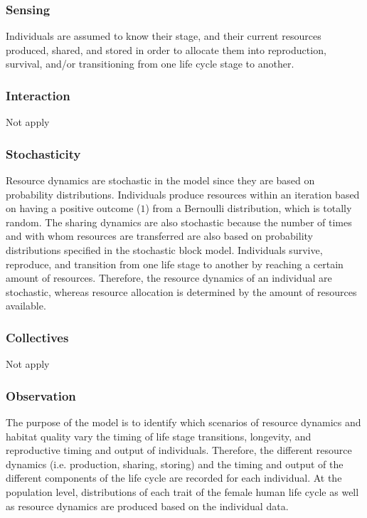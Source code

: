\documentclass{article}
\begin{document}
\subsubsection{Sensing}

Individuals are assumed to know their stage, and their current resources produced, shared, and stored in order to allocate them into reproduction, survival, and/or transitioning from one life cycle stage to another.

\subsubsection{Interaction}

Not apply

\subsubsection{Stochasticity}

Resource dynamics are stochastic in the model since they are based on probability distributions. Individuals produce resources within an iteration based on having a positive outcome ($1$) from a Bernoulli distribution, which is totally random. The sharing dynamics are also stochastic because the number of times and with whom resources are transferred are also based on probability distributions specified in the stochastic block model. Individuals survive, reproduce, and transition from one life stage to another by reaching a certain amount of resources. Therefore, the resource dynamics of an individual are stochastic, whereas resource allocation is determined by the amount of resources available.

\subsubsection{Collectives}

Not apply

\subsubsection{Observation}

The purpose of the model is to identify which scenarios of resource dynamics and habitat quality vary the timing of life stage transitions, longevity, and reproductive timing and output of individuals. Therefore, the different resource dynamics (i.e. production, sharing, storing) and the timing and output of the different components of the life cycle are recorded for each individual. At the population level, distributions of each trait of the female human life cycle as well as resource dynamics are produced based on the individual data.
\end{document}
